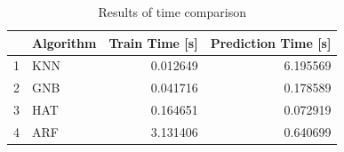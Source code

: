 \begin{table}
\footnotesize
\caption{Results of time comparison}
\label{tab:time comparison}
\begin{tabular}{llrr}
\hline
 & Algorithm & Train Time [s] & Prediction Time [s] \\
\hline
1 & KNN & 0.012649 & 6.195569 \\
2 & GNB & 0.041716 & 0.178589 \\
3 & HAT & 0.164651 & 0.072919 \\
4 & ARF & 3.131406 & 0.640699 \\
\hline
\end{tabular}
\end{table}
